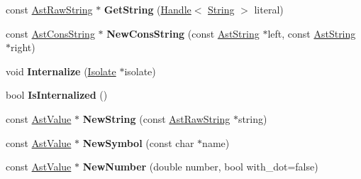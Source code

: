 \begin{DoxyCompactItemize}
\item 
const \hyperlink{classv8_1_1internal_1_1_ast_raw_string}{Ast\+Raw\+String} $\ast$ {\bfseries Get\+String} (\hyperlink{classv8_1_1internal_1_1_handle}{Handle}$<$ \hyperlink{classv8_1_1internal_1_1_string}{String} $>$ literal)\hypertarget{classv8_1_1internal_1_1_ast_value_factory_aaf364273b48895f490ec1008ecd29bed}{}\label{classv8_1_1internal_1_1_ast_value_factory_aaf364273b48895f490ec1008ecd29bed}

\item 
const \hyperlink{classv8_1_1internal_1_1_ast_cons_string}{Ast\+Cons\+String} $\ast$ {\bfseries New\+Cons\+String} (const \hyperlink{classv8_1_1internal_1_1_ast_string}{Ast\+String} $\ast$left, const \hyperlink{classv8_1_1internal_1_1_ast_string}{Ast\+String} $\ast$right)\hypertarget{classv8_1_1internal_1_1_ast_value_factory_a97eccad8901b4bdfa0cc00d4a133f6f3}{}\label{classv8_1_1internal_1_1_ast_value_factory_a97eccad8901b4bdfa0cc00d4a133f6f3}

\item 
void {\bfseries Internalize} (\hyperlink{classv8_1_1internal_1_1_isolate}{Isolate} $\ast$isolate)\hypertarget{classv8_1_1internal_1_1_ast_value_factory_a5deb8e954fe78ec1910d5fe494e602d3}{}\label{classv8_1_1internal_1_1_ast_value_factory_a5deb8e954fe78ec1910d5fe494e602d3}

\item 
bool {\bfseries Is\+Internalized} ()\hypertarget{classv8_1_1internal_1_1_ast_value_factory_ad4d40aa31bd431a57a985f9c87242ed9}{}\label{classv8_1_1internal_1_1_ast_value_factory_ad4d40aa31bd431a57a985f9c87242ed9}

\item 
const \hyperlink{classv8_1_1internal_1_1_ast_value}{Ast\+Value} $\ast$ {\bfseries New\+String} (const \hyperlink{classv8_1_1internal_1_1_ast_raw_string}{Ast\+Raw\+String} $\ast$string)\hypertarget{classv8_1_1internal_1_1_ast_value_factory_acc10654c4900ddf6c9df0eb0db570c5d}{}\label{classv8_1_1internal_1_1_ast_value_factory_acc10654c4900ddf6c9df0eb0db570c5d}

\item 
const \hyperlink{classv8_1_1internal_1_1_ast_value}{Ast\+Value} $\ast$ {\bfseries New\+Symbol} (const char $\ast$name)\hypertarget{classv8_1_1internal_1_1_ast_value_factory_ae532fb5eee98a9b1aca33b08241b4798}{}\label{classv8_1_1internal_1_1_ast_value_factory_ae532fb5eee98a9b1aca33b08241b4798}

\item 
const \hyperlink{classv8_1_1internal_1_1_ast_value}{Ast\+Value} $\ast$ {\bfseries New\+Number} (double number, bool with\+\_\+dot=false)\hypertarget{classv8_1_1internal_1_1_ast_value_factory_a84ff508e5b950bd5232ba39fc7edd8c4}{}\label{classv8_1_1internal_1_1_ast_value_factory_a84ff508e5b950bd5232ba39fc7edd8c4}


\end{DoxyCompactItemize}
